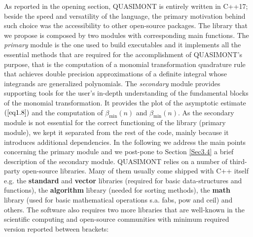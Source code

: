 \documentclass[a4paper, twosided]{book}
\begin{document}
\noindent
As reported in the opening section, QUASIMONT is entirely written in C++17; beside the speed and versatility of the language, the primary motivation behind such choice was the accessibility to other open-source packages. The library that we propose is composed by two modules with  corresponding \colorbox{poliGrayBlue}{main} functions. The {\itshape primary} module is the one used  to build executables and it implements all the essential methods that are required for the accomplishment of QUASIMONT's purpose, that is the computation of a monomial transformation quadrature rule that achieves double precision approximations of a definite integral whose integrands are generalized polynomials.  The {\itshape secondary} module provides supporting tools for the user's in-depth understanding of the fundamental blocks of the monomial transformation. It provides the plot of the asymptotic estimate $(\ref{eq1.8})$ and the computation of $\beta_{\text{min}}(n)$ and $\beta_{\text{min}}(n)$. As the secondary module is not essential for the correct functioning of the library (primary module), we kept it separated from the rest of the code, mainly because it introduces additional dependencies. In the following we address the main points concerning the primary module and we post-pone to Section \ref{Sec3.4} a brief description of the secondary module. QUASIMONT relies on a number of third-party open-source libraries. Many of them usually come shipped with C++ itself e.g. the \color{poliDarkBlue} \textbf{standard} \color{black} and \color{poliDarkBlue} \textbf{vector} \color{black} libraries (required for basic data-structures and functions), the \color{poliDarkBlue} \textbf{algorithm} \color{black} library (needed for sorting methods), the \color{poliDarkBlue} \textbf{math} \color{black} library (used for basic mathematical operations s.a. \colorbox{poliGrayBlue}{fabs}, \colorbox{poliGrayBlue}{pow} and \colorbox{poliGrayBlue}{ceil}) and others. The software also requires two more libraries that are well-known in the scientific computing and open-source communities with minimum required version reported between brackets:
\end{document}
